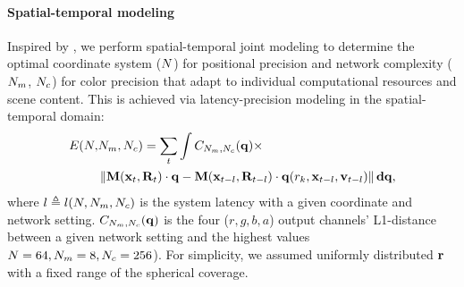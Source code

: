 \paragraph{Spatial-temporal modeling}

Inspired by \cite{Li:2020:TSP,albert2017latency}, we perform spatial-temporal joint modeling to determine the optimal coordinate system ($N$) for positional precision and network complexity ($N_{m}$, $N_{c}$) for color precision that adapt to individual computational resources and scene content. This is achieved via latency-precision modeling in the spatial-temporal domain:
\begin{equation}
\begin{aligned}
E(N, &N_{m}, N_{c}) = 
\sum_t\int C_{N_{m}, N_{c}}(\mathbf{q})\times\\ &\left\lVert\mathbf{M}(\mathbf{x}_t,\mathbf{R}_t)\cdot\mathbf{q}-\mathbf{M}(\mathbf{x}_{t-l},\mathbf{R}_{t-l})\cdot\mathbf{q}(r_k,\mathbf{x}_{t-l},\mathbf{v}_{t-l})\right\rVert\mathbf{d}\mathbf{q},
\label{eq:error:image}
\end{aligned}
\end{equation}
where $l\triangleq l(N, N_{m}, N_{c})$ is the system latency with a given coordinate and network setting.
$C_{N_{m}, N_{c}}(\mathbf{q})$ is the four ($r,g,b,a$) output channels' L1-distance between a given network setting and the highest values $N=64,N_{m}=8,N_{c}=256$). For simplicity, we assumed uniformly distributed $\mathbf{r}$ with a fixed range of the spherical coverage.%

